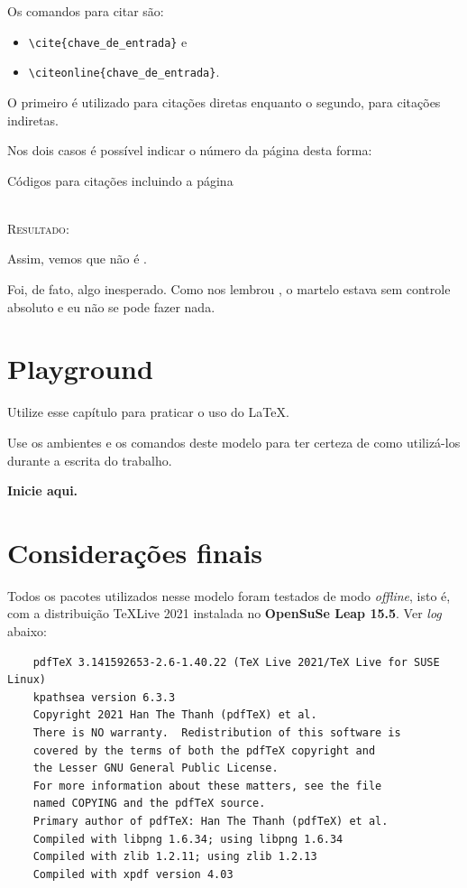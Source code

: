 \documentclass[a4paper,12pt,oneside,openright,extrafontsizes,openbib]{memoir}
\begin{document}
{{Os comandos para citar são: 
\begin{itemize}
	\item \verb|\cite{chave_de_entrada}| e 
	\item \verb|\citeonline{chave_de_entrada}|. 
\end{itemize}

O primeiro é utilizado para citações diretas enquanto o segundo, para citações indiretas.

Nos dois casos é possível indicar o número da página desta forma:
\ \\

\begin{codex}{Códigos para citações incluindo a página}
\cite[p. 35]{Flintstones1900}

\end{codex}
\ \\

\textsc{Resultado:}

Assim, vemos que não é  \cite[p. 35]{Flintstones1900}.

Foi, de fato, algo inesperado. Como nos lembrou , o martelo estava sem controle absoluto e eu não se pode fazer nada.

\chapter{Playground}

Utilize esse capítulo para praticar o uso do \LaTeX.

Use os ambientes e os comandos deste modelo para ter certeza de como utilizá-los durante a escrita do trabalho.

\textbf{Inicie aqui.}




\chapter{Considerações finais}

Todos os pacotes utilizados nesse modelo foram testados de modo \textit{offline}, isto é, com a distribuição \TeX Live 2021 instalada no \textbf{OpenSuSe Leap 15.5}. Ver \textit{log} abaixo:

\begin{verbatim}
	pdfTeX 3.141592653-2.6-1.40.22 (TeX Live 2021/TeX Live for SUSE Linux)
	kpathsea version 6.3.3
	Copyright 2021 Han The Thanh (pdfTeX) et al.
	There is NO warranty.  Redistribution of this software is
	covered by the terms of both the pdfTeX copyright and
	the Lesser GNU General Public License.
	For more information about these matters, see the file
	named COPYING and the pdfTeX source.
	Primary author of pdfTeX: Han The Thanh (pdfTeX) et al.
	Compiled with libpng 1.6.34; using libpng 1.6.34
	Compiled with zlib 1.2.11; using zlib 1.2.13
	Compiled with xpdf version 4.03
\end{verbatim}

}}
\end{document}
